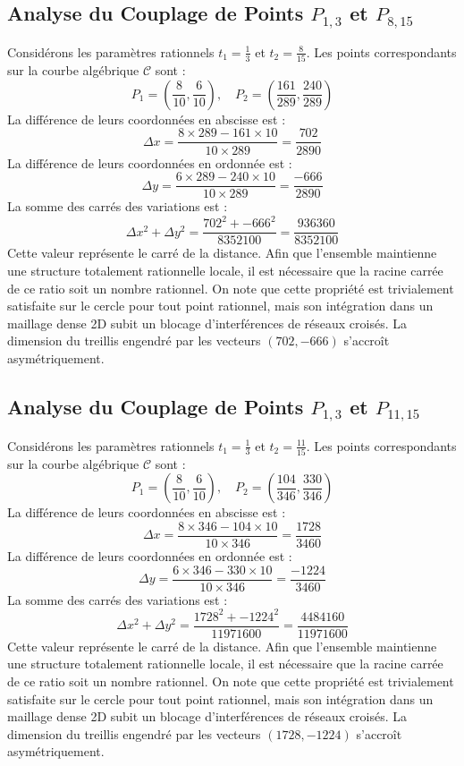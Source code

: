 \documentclass[12pt, a4paper]{article}
\begin{document}
\subsection{Analyse du Couplage de Points $P_{1,3}$ et $P_{8,15}$}
Considérons les paramètres rationnels $t_1 = \frac{1}{3}$ et $t_2 = \frac{8}{15}$.
Les points correspondants sur la courbe algébrique $\mathcal{C}$ sont :
$$ P_1 = \left( \frac{8}{10}, \frac{6}{10} \right), \quad P_2 = \left( \frac{161}{289}, \frac{240}{289} \right) $$
La différence de leurs coordonnées en abscisse est :
$$ \Delta x = \frac{8 \times 289 - 161 \times 10}{10 \times 289} = \frac{702}{2890} $$
La différence de leurs coordonnées en ordonnée est :
$$ \Delta y = \frac{6 \times 289 - 240 \times 10}{10 \times 289} = \frac{-666}{2890} $$
La somme des carrés des variations est :
$$ \Delta x^2 + \Delta y^2 = \frac{ 702^2 + -666^2 }{ 8352100 } = \frac{ 936360 }{ 8352100 } $$
Cette valeur représente le carré de la distance. Afin que l'ensemble maintienne une structure totalement rationnelle locale, il est nécessaire que la racine carrée de ce ratio soit un nombre rationnel. On note que cette propriété est trivialement satisfaite sur le cercle pour tout point rationnel, mais son intégration dans un maillage dense 2D subit un blocage d'interférences de réseaux croisés. La dimension du treillis engendré par les vecteurs $( 702, -666 )$ s'accroît asymétriquement.


\subsection{Analyse du Couplage de Points $P_{1,3}$ et $P_{11,15}$}
Considérons les paramètres rationnels $t_1 = \frac{1}{3}$ et $t_2 = \frac{11}{15}$.
Les points correspondants sur la courbe algébrique $\mathcal{C}$ sont :
$$ P_1 = \left( \frac{8}{10}, \frac{6}{10} \right), \quad P_2 = \left( \frac{104}{346}, \frac{330}{346} \right) $$
La différence de leurs coordonnées en abscisse est :
$$ \Delta x = \frac{8 \times 346 - 104 \times 10}{10 \times 346} = \frac{1728}{3460} $$
La différence de leurs coordonnées en ordonnée est :
$$ \Delta y = \frac{6 \times 346 - 330 \times 10}{10 \times 346} = \frac{-1224}{3460} $$
La somme des carrés des variations est :
$$ \Delta x^2 + \Delta y^2 = \frac{ 1728^2 + -1224^2 }{ 11971600 } = \frac{ 4484160 }{ 11971600 } $$
Cette valeur représente le carré de la distance. Afin que l'ensemble maintienne une structure totalement rationnelle locale, il est nécessaire que la racine carrée de ce ratio soit un nombre rationnel. On note que cette propriété est trivialement satisfaite sur le cercle pour tout point rationnel, mais son intégration dans un maillage dense 2D subit un blocage d'interférences de réseaux croisés. La dimension du treillis engendré par les vecteurs $( 1728, -1224 )$ s'accroît asymétriquement.
\end{document}
